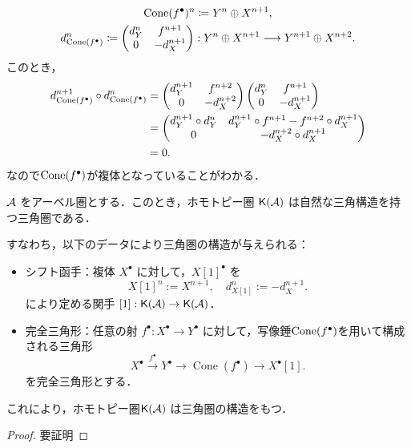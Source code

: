 \begin{gather*}
  \operatorname{\mathrm{Cone}}(f^\bullet)^n \coloneq Y^n \oplus X^{n+1}, \\
  d^n_{\operatorname{\mathrm{Cone}}(f^\bullet)} \coloneq
  \begin{pmatrix}
    d_Y^n & f^{n+1} \\
    0     & -d_X^{n+1}
  \end{pmatrix}
  : Y^n \oplus X^{n+1} \longrightarrow Y^{n+1} \oplus X^{n+2}.
\end{gather*}
このとき，
\begin{align*}
	d^{n+1}_{\operatorname{\mathrm{Cone}}(f^\bullet)}\circ d^n_{\operatorname{\mathrm{Cone}}(f^\bullet)} &=
  \begin{pmatrix}
		d_Y^{n+1} & f^{n+2} \\
    0     & -d_X^{n+2}
  \end{pmatrix}
  \begin{pmatrix}
    d_Y^n & f^{n+1} \\
    0     & -d_X^{n+1}
  \end{pmatrix}\\
																												 &= 
  \begin{pmatrix}
		d_Y^{n+1}\circ d_Y^n & d_Y^{n+1}\circ f^{n+1} - f^{n+2}\circ d_X^{n+1} \\
    0     & -d_X^{n+2}\circ d_X^{n+1}
  \end{pmatrix}\\
					&= 0.
\end{align*}
なので$\operatorname{\mathrm{Cone}}(f^\bullet)$が複体となっていることがわかる．
\begin{prop}\cite[p.273]{KS06}
${\mathcal A}$ をアーベル圏とする．このとき，ホモトピー圏 $\mathsf{K}({\mathcal A})$ は自然な三角構造を持つ三角圏である．

すなわち，以下のデータにより三角圏の構造が与えられる：
\begin{itemize}
  \item シフト函手：複体 $X^\bullet$ に対して，$X[1]^\bullet$ を
  \[
    X[1]^n := X^{n+1}, \quad d_{X[1]}^n := -d_X^{n+1}.
  \]
  により定める関手 $[1]: \mathsf{K}({\mathcal A}) \to \mathsf{K}({\mathcal A})$．
  
  \item 完全三角形：任意の射 $f^\bullet: X^\bullet \to Y^\bullet$ に対して，写像錘$\operatorname{\mathrm{Cone}}(f^\bullet)$を用いて構成される三角形
  \[
    X^\bullet \xrightarrow{f^\bullet} Y^\bullet \to \operatorname{Cone}(f^\bullet) \to X^\bullet[1].
  \]
  を完全三角形とする．
\end{itemize}

これにより，ホモトピー圏$\mathsf{K}({\mathcal A})$ は三角圏の構造をもつ．
\end{prop}
\begin{proof}
	{\color{red}要証明}	
\end{proof}




